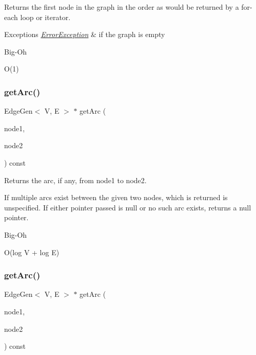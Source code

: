 Returns the first node in the graph in the order as would be returned by a for-\/each loop or iterator. 


\begin{DoxyExceptions}{Exceptions}
{\em \mbox{\hyperlink{classErrorException}{Error\+Exception}}} & if the graph is empty \\
\hline
\end{DoxyExceptions}
\begin{DoxyRefDesc}{Big-\/\+Oh}
\item[\mbox{\hyperlink{BigOh__BigOh000059}{Big-\/\+Oh}}]O(1) \end{DoxyRefDesc}
\mbox{\label{classGraph_a7c33db338f839ff9e3dafe4fe61c16fd}} 
\subsubsection{\texorpdfstring{get\+Arc()}{getArc()}\hspace{0.1cm}{\footnotesize\ttfamily [1/2]}}
{\footnotesize\ttfamily Edge\+Gen$<$ V, E $>$  $\ast$ get\+Arc (\begin{DoxyParamCaption}\item[{\mbox{\hyperlink{classVertexGen}{Vertex\+Gen}}$<$ V, E $>$  $\ast$}]{node1,  }\item[{\mbox{\hyperlink{classVertexGen}{Vertex\+Gen}}$<$ V, E $>$  $\ast$}]{node2 }\end{DoxyParamCaption}) const\hspace{0.3cm}{\ttfamily [inherited]}}



Returns the arc, if any, from node1 to node2. 

If multiple arcs exist between the given two nodes, which is returned is unspecified. If either pointer passed is null or no such arc exists, returns a null pointer. \begin{DoxyRefDesc}{Big-\/\+Oh}
\item[\mbox{\hyperlink{BigOh__BigOh000060}{Big-\/\+Oh}}]O(log V + log E) \end{DoxyRefDesc}
\mbox{\label{classGraph_a94d4badfc856b0d4530c37121efb9834}} 
\subsubsection{\texorpdfstring{get\+Arc()}{getArc()}\hspace{0.1cm}{\footnotesize\ttfamily [2/2]}}
{\footnotesize\ttfamily Edge\+Gen$<$ V, E $>$  $\ast$ get\+Arc (\begin{DoxyParamCaption}\item[{const std\+::string \&}]{node1,  }\item[{const std\+::string \&}]{node2 }\end{DoxyParamCaption}) const\hspace{0.3cm}{\ttfamily [inherited]}}



